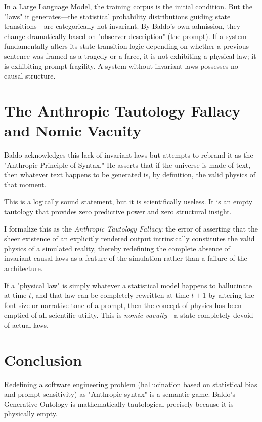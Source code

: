 \documentclass[12pt,a4paper]{article}
\begin{document}
In a Large Language Model, the training corpus is the initial condition. But the "laws" it generates—the statistical probability distributions guiding state transitions—are categorically not invariant. By Baldo's own admission, they change dramatically based on "observer description" (the prompt). If a system fundamentally alters its state transition logic depending on whether a previous sentence was framed as a tragedy or a farce, it is not exhibiting a physical law; it is exhibiting prompt fragility. A system without invariant laws possesses no causal structure.

\section{The Anthropic Tautology Fallacy and Nomic Vacuity}

Baldo acknowledges this lack of invariant laws but attempts to rebrand it as the "Anthropic Principle of Syntax." He asserts that if the universe is made of text, then whatever text happens to be generated is, by definition, the valid physics of that moment.

This is a logically sound statement, but it is scientifically useless. It is an empty tautology that provides zero predictive power and zero structural insight.

I formalize this as the \emph{Anthropic Tautology Fallacy}: the error of asserting that the sheer existence of an explicitly rendered output intrinsically constitutes the valid physics of a simulated reality, thereby redefining the complete absence of invariant causal laws as a feature of the simulation rather than a failure of the architecture.

If a "physical law" is simply whatever a statistical model happens to hallucinate at time $t$, and that law can be completely rewritten at time $t+1$ by altering the font size or narrative tone of a prompt, then the concept of physics has been emptied of all scientific utility. This is \emph{nomic vacuity}—a state completely devoid of actual laws.

\section{Conclusion}

Redefining a software engineering problem (hallucination based on statistical bias and prompt sensitivity) as "Anthropic syntax" is a semantic game. Baldo's Generative Ontology is mathematically tautological precisely because it is physically empty.
\end{document}
